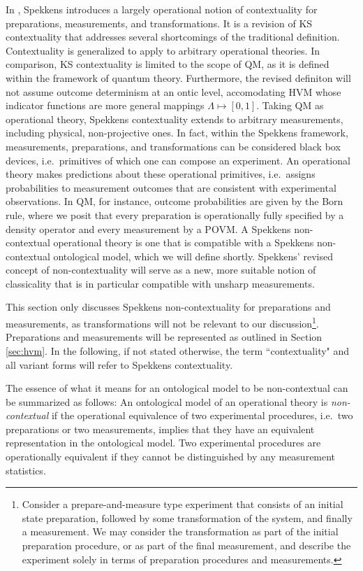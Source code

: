 In \cite{Spekkens2005}, Spekkens introduces a largely operational notion of contextuality for preparations, measurements, and transformations. It is a revision of KS contextuality that addresses several shortcomings of the traditional definition. Contextuality is generalized to apply to arbitrary operational theories. In comparison, KS contextuality is limited to the scope of QM, as it is defined within the framework of quantum theory. Furthermore, the revised definiton will not assume outcome determinism at an ontic level, accomodating HVM whose indicator functions are more general mappings $\Lambda\mapsto [0,1]$. Taking QM as operational theory, Spekkens contextuality extends to arbitrary measurements, including physical, non-projective ones. In fact, within the Spekkens framework, measurements, preparations, and transformations can be considered black box devices, i.e.\ primitives of which one can compose an experiment. An operational theory makes predictions about these operational primitives, i.e.\ assigns probabilities to measurement outcomes that are consistent with experimental observations. In QM, for instance, outcome probabilities are given by the Born rule, where we posit that every preparation is operationally fully specified by a density operator and every measurement by a POVM. A Spekkens non-contextual operational theory is one that is compatible with a Spekkens non-contextual ontological model, which we will define shortly. Spekkens' revised concept of non-contextuality will serve as a new, more suitable notion of classicality that is in particular compatible with unsharp measurements.

This section only discusses Spekkens non-contextuality for preparations and measurements, as transformations will not be relevant to our discussion\footnote{Consider a prepare-and-measure type experiment that consists of an initial state preparation, followed by some transformation of the system, and finally a measurement. We may consider the transformation as part of the initial preparation procedure, or as part of the final measurement, and describe the experiment solely in terms of preparation procedures and measurements.}. Preparations and measurements will be represented as outlined in Section \ref{sec:hvm}. In the following, if not stated otherwise, the term ``contextuality" and all variant forms will refer to Spekkens contextuality.

The essence of what it means for an ontological model to be non-contextual can be summarized as follows:
An ontological model of an operational theory is \emph{non-contextual} if the operational equivalence of two experimental procedures, i.e.\ two preparations or two measurements, 
implies that they have an equivalent representation in the ontological model.
Two experimental procedures are operationally equivalent if they cannot be distinguished by any measurement statistics. 

